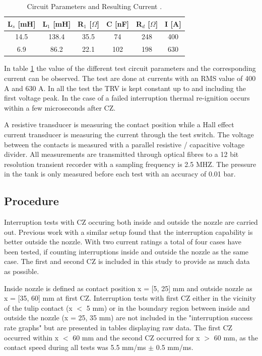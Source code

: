 \documentclass[10pt,a4paper,twoside]{article}
\begin{document}
\begin{table}[H]
\center
\caption{Circuit Parameters and Resulting Current \cite{bib:AFIMVLBA}. }
\begin{tabular}{|c|c|c|c|c|c|}
\hline 
L$_s$ [mH] & L$_1$ [mH] & R$_1$ [$\Omega$] & C [nF] & R$_{d}$ [$\Omega$] & I [A] \\ 
\hline 
14.5 & 138.4 & 35.5 & 74 & 248 & 400 \\ 
\hline 
6.9 & 86.2 & 22.1 & 102 & 198 & 630 \\ 
\hline 
\end{tabular} 
\label{tab:testParameters}
\end{table}

In table \ref{tab:testParameters} the value of the different test circuit parameters and the corresponding current can be observed. The test are done at currents with an RMS value of 400 A and 630 A. In all the test the TRV is kept constant up to and including the first voltage peak. In the case of a failed interruption thermal re-ignition occurs within a few microseconds after CZ.

A resistive transducer is measuring the contact position while a Hall effect current transducer is measuring the current through the test switch. The voltage between the contacts is measured with a parallel resistive / capacitive voltage divider. All measurements are transmitted through optical fibres to a 12 bit resolution transient recorder with a sampling frequency is 2.5 MHZ. The pressure in the tank is only measured before each test with an accuracy of 0.01 bar.

\subsection{Procedure} \label{sec:procedure}
Interruption tests with CZ occuring both inside and outside the nozzle are carried out. Previous work with a similar setup found that the interruption capability is better outside the nozzle. With two current ratings a total of four cases have been tested, if counting interruptions inside and outside the nozzle as the same case. The first and second CZ is included in this study to provide as much data as possible.

Inside nozzle is defined as contact position x = [5, 25] mm and outside nozzle as x = [35, 60] mm at first CZ. Interruption tests with first CZ either in the vicinity of the tulip contact (x $<$ 5 mm) or in the boundary region between inside and outside the nozzle (x = 25, 35 mm) are not included in the "interruption success rate graphs" but are presented in tables displaying raw data. The first CZ occurred within x $<$ 60 mm and the second CZ occurred for x $>$ 60 mm, as the contact speed during all tests was 5.5 mm/ms $\pm$ 0.5 mm/ms.
\end{document}
